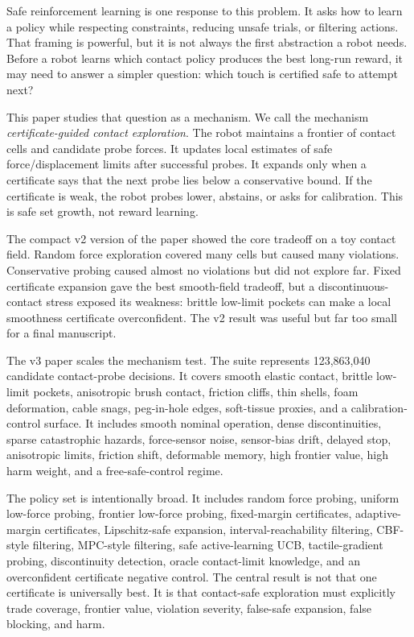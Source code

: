 \documentclass{article}
\begin{document}
Safe reinforcement learning is one response to this problem. It asks how to
learn a policy while respecting constraints, reducing unsafe trials, or
filtering actions. That framing is powerful, but it is not always the first
abstraction a robot needs. Before a robot learns which contact policy produces
the best long-run reward, it may need to answer a simpler question: which touch
is certified safe to attempt next?

This paper studies that question as a mechanism. We call the mechanism
\emph{certificate-guided contact exploration}. The robot maintains a frontier
of contact cells and candidate probe forces. It updates local estimates of
safe force/displacement limits after successful probes. It expands only when a
certificate says that the next probe lies below a conservative bound. If the
certificate is weak, the robot probes lower, abstains, or asks for
calibration. This is safe set growth, not reward learning.

The compact v2 version of the paper showed the core tradeoff on a toy contact
field. Random force exploration covered many cells but caused many violations.
Conservative probing caused almost no violations but did not explore far.
Fixed certificate expansion gave the best smooth-field tradeoff, but a
discontinuous-contact stress exposed its weakness: brittle low-limit pockets
can make a local smoothness certificate overconfident. The v2 result was useful
but far too small for a final manuscript.

The v3 paper scales the mechanism test. The suite represents 123,863,040
candidate contact-probe decisions. It covers smooth elastic contact, brittle
low-limit pockets, anisotropic brush contact, friction cliffs, thin shells,
foam deformation, cable snags, peg-in-hole edges, soft-tissue proxies, and a
calibration-control surface. It includes smooth nominal operation, dense
discontinuities, sparse catastrophic hazards, force-sensor noise, sensor-bias
drift, delayed stop, anisotropic limits, friction shift, deformable memory,
high frontier value, high harm weight, and a free-safe-control regime.

The policy set is intentionally broad. It includes random force probing,
uniform low-force probing, frontier low-force probing, fixed-margin
certificates, adaptive-margin certificates, Lipschitz-safe expansion,
interval-reachability filtering, CBF-style filtering, MPC-style filtering,
safe active-learning UCB, tactile-gradient probing, discontinuity detection,
oracle contact-limit knowledge, and an overconfident certificate negative
control. The central result is not that one certificate is universally best.
It is that contact-safe exploration must explicitly trade coverage, frontier
value, violation severity, false-safe expansion, false blocking, and harm.
\end{document}
